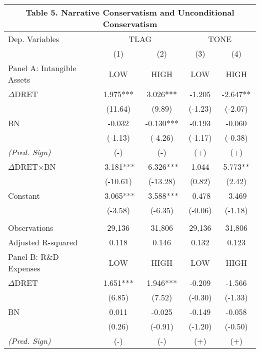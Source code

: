 \begin{table}[H] \label{T5}
	\begin{center}
		\tabcolsep=0.11cm
		\begin{tabular}{lcccc}
			\multicolumn{5}{c}{\textbf{Table 5. Narrative Conservatism and Unconditional Conservatism}} \\
			\toprule
			\toprule
			Dep. Variables & \multicolumn{2}{c}{TLAG} & \multicolumn{2}{c}{TONE} \\
			\cmidrule{2-5}
			& (1) & (2) & (3) & (4) \\
			\midrule
			Panel A: Intangible Assets & LOW & HIGH & LOW & HIGH \\
			\midrule
			$\Delta$DRET & 1.975*** & 3.026*** & -1.205 & -2.647** \\
			& (11.64) & (9.89) & (-1.23) & (-2.07) \\
			BN & -0.032 & -0.130*** & -0.193 & -0.060 \\
			& (-1.13) & (-4.26) & (-1.17) & (-0.38) \\
			\rowcolor[rgb]{ .906,  .902,  .902} \textit{(Pred. Sign)} & (-) & (-) & (+) & (+) \\
			\rowcolor[rgb]{ .906,  .902,  .902} $\Delta$DRET$\times$BN & -3.181*** & -6.326*** & 1.044 & 5.773** \\
			\rowcolor[rgb]{ .906,  .902,  .902} & (-10.61) & (-13.28) & (0.82) & (2.42) \\
			Constant & -3.065*** & -3.588*** & -0.478 & -3.469 \\
			& (-3.58) & (-6.35) & (-0.06) & (-1.18) \\
			&   &   &   &  \\
			Observations & 29,136 & 31,806 & 29,136 & 31,806 \\
			Adjusted R-squared & 0.118 & 0.146 & 0.132 & 0.123 \\
			\midrule
			Panel B: R\&D Expenses & LOW & HIGH & LOW & HIGH \\
			\midrule
			$\Delta$DRET & 1.651*** & 1.946*** & -0.209 & -1.566 \\
			& (6.85) & (7.52) & (-0.30) & (-1.33) \\
			BN & 0.011 & -0.025 & -0.149 & -0.058 \\
			& (0.26) & (-0.91) & (-1.20) & (-0.50) \\
			\rowcolor[rgb]{ .906,  .902,  .902} \textit{(Pred. Sign)} & (-) & (-) & (+) & (+) \\

\end{tabular}
\end{center}
\end{table}
